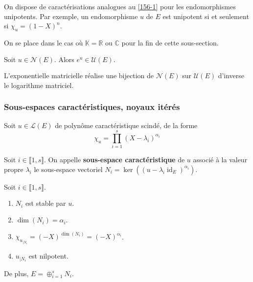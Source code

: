   \begin{remark}
    On dispose de caractérisations analogues au \cref{156-1} pour les endomorphismes unipotents. Par exemple, un endomorphisme $u$ de $E$ est unipotent si et seulement si $\chi_u = (1-X)^n$.
  \end{remark}

  On se place dans le cas où $\mathbb{K} = \mathbb{R}$ ou $\mathbb{C}$ pour la fin de cette sous-section.


  \begin{proposition}
    Soit $u \in \mathcal{N}(E)$. Alors $e^u \in \mathcal{U}(E)$.
  \end{proposition}

  \begin{theorem}
    L'exponentielle matricielle réalise une bijection de $\mathcal{N}(E)$ sur $\mathcal{U}(E)$ d'inverse le logarithme matriciel.
  \end{theorem}

  \subsubsection{Sous-espaces caractéristiques, noyaux itérés}


  Soit $u \in \mathcal{L}(E)$ de polynôme caractéristique scindé, de la forme
  \[ \chi_u = \prod_{i=1}^{s} (X-\lambda_i)^{\alpha_i} \]

  \begin{definition}
    Soit $i \in \llbracket 1, s \rrbracket$. On appelle \textbf{sous-espace caractéristique} de $u$ associé à la valeur propre $\lambda_i$ le sous-espace vectoriel $N_i = \ker((u-\lambda_i \operatorname{id}_E)^{\alpha_i})$.
  \end{definition}

  \begin{proposition}
    Soit $i \in \llbracket 1, s \rrbracket$.
    \begin{enumerate}[label=(\roman*)]
      \item $N_i$ est stable par $u$.
      \item $\dim(N_i) = \alpha_i$.
      \item $\chi_{u_{|N_i}} = (-X)^{\dim(N_i)} = (-X)^{\alpha_i}$.
      \item $u_{|N_i}$ est nilpotent.
    \end{enumerate}
    De plus, $E = \oplus_{i=1}^s N_i$.
  \end{proposition}

